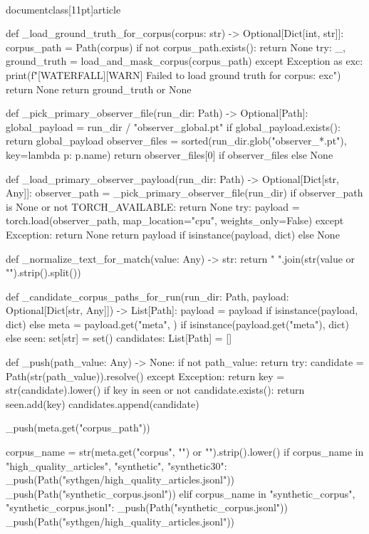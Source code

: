 \\documentclass[11pt]{article}
\begin{document}
\begin{CodeBlock}
def _load_ground_truth_for_corpus(corpus: str) -> Optional[Dict[int, str]]:
    corpus_path = Path(corpus)
    if not corpus_path.exists():
        return None
    try:
        _, ground_truth = load_and_mask_corpus(corpus_path)
    except Exception as exc:
        print(f"[WATERFALL][WARN] Failed to load ground truth for {corpus}: {exc}")
        return None
    return ground_truth or None


def _pick_primary_observer_file(run_dir: Path) -> Optional[Path]:
    global_payload = run_dir / "observer_global.pt"
    if global_payload.exists():
        return global_payload
    observer_files = sorted(run_dir.glob("observer_*.pt"), key=lambda p: p.name)
    return observer_files[0] if observer_files else None


def _load_primary_observer_payload(run_dir: Path) -> Optional[Dict[str, Any]]:
    observer_path = _pick_primary_observer_file(run_dir)
    if observer_path is None or not TORCH_AVAILABLE:
        return None
    try:
        payload = torch.load(observer_path, map_location="cpu", weights_only=False)
    except Exception:
        return None
    return payload if isinstance(payload, dict) else None


def _normalize_text_for_match(value: Any) -> str:
    return " ".join(str(value or "").strip().split())


def _candidate_corpus_paths_for_run(run_dir: Path, payload: Optional[Dict[str, Any]]) -> List[Path]:
    payload = payload if isinstance(payload, dict) else {}
    meta = payload.get("meta", {}) if isinstance(payload.get("meta"), dict) else {}
    seen: set[str] = set()
    candidates: List[Path] = []

    def _push(path_value: Any) -> None:
        if not path_value:
            return
        try:
            candidate = Path(str(path_value)).resolve()
        except Exception:
            return
        key = str(candidate).lower()
        if key in seen or not candidate.exists():
            return
        seen.add(key)
        candidates.append(candidate)

    _push(meta.get("corpus_path"))

    corpus_name = str(meta.get("corpus", "") or "").strip().lower()
    if corpus_name in {"high_quality_articles", "synthetic", "synthetic30"}:
        _push(Path("sythgen/high_quality_articles.jsonl"))
        _push(Path("synthetic_corpus.jsonl"))
    elif corpus_name in {"synthetic_corpus", "synthetic_corpus.jsonl"}:
        _push(Path("synthetic_corpus.jsonl"))
        _push(Path("sythgen/high_quality_articles.jsonl"))


\end{CodeBlock}
\end{document}
